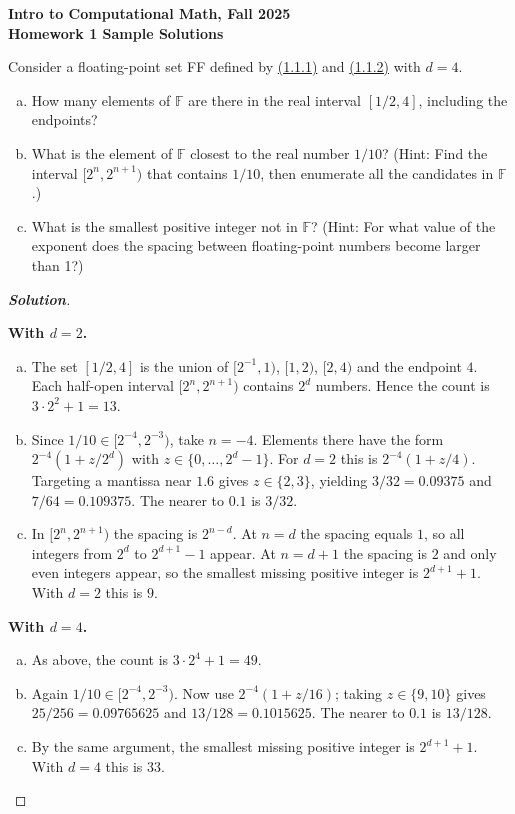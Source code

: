 \documentclass[11pt]{article}
\newenvironment{problem}[2][Question]{\begin{trivlist}
\item[\hskip \labelsep {\bfseries #1}\hskip \labelsep {\bfseries #2.}]}{\end{trivlist}}
\newenvironment{spacedproof}[1][\proofname]{%
  \begin{proof}[\textbf{#1}]$ $\par\nobreak\ignorespaces
}{%
  \end{proof}
}
\theoremstyle{definition}
\begin{document}
\begin{center}
{\bf Intro to Computational Math, Fall 2025\\
Homework 1 Sample Solutions}
\end{center}

\begin{problem}{1}
Consider a floating-point set FF defined by \href{https://fncbook.com/floating-point/#floatpoint}{(1.1.1)} and \href{https://fncbook.com/floating-point/#mantissa}{(1.1.2)} with $d = 4$.

\begin{enumerate}[(a)]
    \item How many elements of $\mathbb{F}$ are there in the real interval $[1/2,4]$, including the endpoints?
    \item What is the element of $\mathbb{F}$ closest to the real number $1/10$? (Hint: Find the interval $[2^n, 2^{n+1})$ that contains $1/10$, then enumerate all the candidates in $\mathbb{F}$.)
    \item What is the smallest positive integer not in $\mathbb{F}$? (Hint: For what value of the exponent does the spacing between floating-point numbers become larger than 1?)
\end{enumerate}
\end{problem}
\begin{spacedproof}[Solution]
\textbf{With $d=2$.}

\begin{enumerate}[(a)]
    \item The set $[1/2,4]$ is the union of $[2^{-1},1)$, $[1,2)$, $[2,4)$ and the endpoint $4$. Each half-open interval $[2^n,2^{n+1})$ contains $2^d$ numbers. Hence the count is $3\cdot 2^2 + 1 = 13$.
    \item Since $1/10 \in [2^{-4},2^{-3})$, take $n=-4$. Elements there have the form $2^{-4}(1+z/2^d)$ with $z\in\{0,\dots,2^d-1\}$. For $d=2$ this is $2^{-4}(1+z/4)$. Targeting a mantissa near $1.6$ gives $z\in\{2,3\}$, yielding $3/32=0.09375$ and $7/64=0.109375$. The nearer to $0.1$ is $3/32$.
    \item In $[2^n,2^{n+1})$ the spacing is $2^{n-d}$. At $n=d$ the spacing equals $1$, so all integers from $2^d$ to $2^{d+1}-1$ appear. At $n=d+1$ the spacing is $2$ and only even integers appear, so the smallest missing positive integer is $2^{d+1}+1$. With $d=2$ this is $9$.
\end{enumerate}

\medskip

\textbf{With $d=4$.}
\begin{enumerate}[(a)]
    \item As above, the count is $3\cdot 2^4 + 1 = 49$.
    \item Again $1/10 \in [2^{-4},2^{-3})$. Now use $2^{-4}(1+z/16)$; taking $z\in\{9,10\}$ gives $25/256=0.09765625$ and $13/128=0.1015625$. The nearer to $0.1$ is $13/128$.
    \item By the same argument, the smallest missing positive integer is $2^{d+1}+1$. With $d=4$ this is $33$.
\end{enumerate}
\end{spacedproof}
\end{document}
